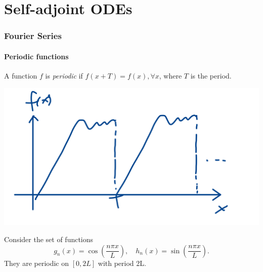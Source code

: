 \documentclass[a4paper]{article}
\begin{document}
\maketitle
\tableofcontents
\clearpage
\part{Self-adjoint ODEs}
\section{Fourier Series}
\subsection{Periodic functions}
\begin{definition}
    A function $f$ is \textit{periodic} if $ f(x+T)=f(x), \forall x $, where $T$ is the period.
\end{definition}
\begin{center}
    \includegraphics[scale=0.1]{methods1.jpeg}
\end{center}
Consider the set of functions 
\[
    g_n(x) = \cos \left( \frac{n\pi x}{L} \right),\quad h_n(x) = \sin \left( \frac{n\pi x}{L} \right).
\]
They are periodic on $ [0,2L] $ with period 2L.
\end{document}
